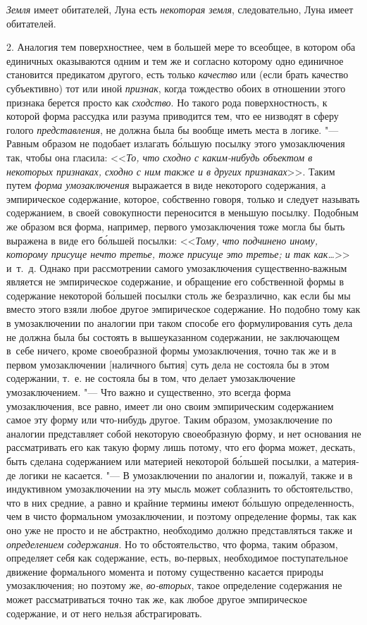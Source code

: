 {\em Земля} имеет обитателей,
Луна есть {\em некоторая земля},
следовательно, Луна имеет обитателей.

2. Аналогия тем поверхностнее, чем в большей мере то всеобщее,
в котором оба единичных оказываются одним и тем же и согласно которому одно
единичное становится предикатом другого, есть только
{\em качество} или (если
брать качество субъективно) тот или иной
{\em признак}, когда
тождество обоих в отношении этого признака берется просто как
{\em сходство}. Но такого
рода поверхностность, к которой форма рассудка или разума приводится тем,
что ее низводят в сферу голого
{\em представления}, не
должна была бы вообще иметь места в логике. "--- Равным
образом не подобает излагать б\'{о}льшую посылку этого умозаключения так, чтобы
она гласила: <<{\em То, что сходно с
каким-нибудь объектом в некоторых признаках, сходно с ним также и в других
признаках}>>. Таким путем
{\em форма умозаключения}
выражается в виде некоторого содержания, а эмпирическое
содержание, которое, собственно говоря, только и следует называть
содержанием, в своей совокупности переносится в меньшую посылку. Подобным
же образом вся форма, например, первого умозаключения тоже могла бы быть
выражена в виде его б\'{о}льшей посылки:
<<{\em Тому, что подчинено иному, которому присуще нечто третье,
тоже присуще это третье; и так как…}>> и~т.~д. Однако при рассмотрении самого
умозаключения существенно-важным является не эмпирическое содержание, и
обращение его собственной формы в содержание некоторой б\'{о}льшей посылки
столь же безразлично, как если бы мы вместо этого взяли
любое другое эмпирическое содержание. Но подобно тому как в умозаключении
по аналогии при таком способе его формулирования суть дела не должна была
бы состоять в вышеуказанном содержании, не заключающем в~себе ничего, кроме
своеобразной формы умозаключения, точно так же и в первом умозаключении
[наличного бытия] суть дела не состояла бы в этом содержании, т.~е. не
состояла бы в том, что делает умозаключение умозаключением. "---
Что важно и существенно, это всегда форма умозаключения, все
равно, имеет ли оно своим эмпирическим содержанием самое эту форму или
что-нибудь другое. Таким образом, умозаключение по аналогии представляет
собой некоторую своеобразную форму, и нет основания не рассматривать его
как такую форму лишь потому, что его форма может, дескать, быть сделана
содержанием или материей некоторой б\'{о}льшей посылки, а материя-де логики не
касается. "--- В умозаключении по аналогии и, пожалуй, также и
в индуктивном умозаключении на эту мысль может соблазнить то
обстоятельство, что в них средние, а равно и крайние термины имеют б\'{о}льшую
определенность, чем в чисто формальном умозаключении, и поэтому определение
формы, так как оно уже не просто и не абстрактно, необходимо должно
представляться также и {\em определением
содержания}. Но то обстоятельство, что форма, таким образом,
определяет себя как содержание, есть, во-первых, необходимое поступательное
движение формального момента и потому существенно касается природы
умозаключения; но поэтому же,
{\em во-вторых}, такое
определение содержания не может рассматриваться точно так же, как любое
другое эмпирическое содержание, и от него нельзя абстрагировать.

